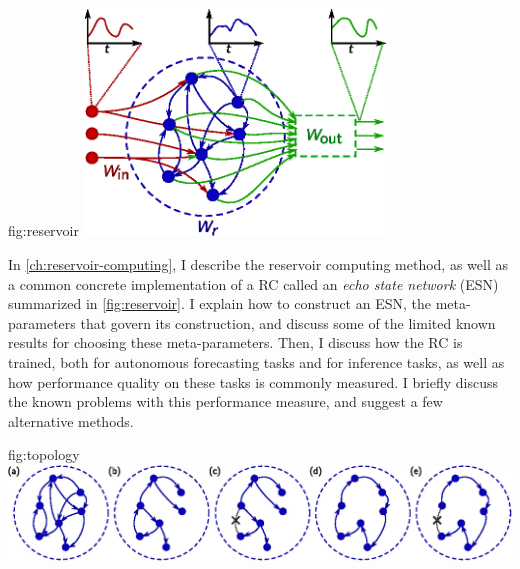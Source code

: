 \begin{reusefigure}{fig:reservoir}
  \includegraphics[width=0.6\textwidth]{figures/reservoir}
  \caption{High-level view of an echo state network RC. Each node may
    have two kinds of input connections: connections to other nodes in
    the network ($W_r$, blue), connections to the overall input
    ($W_\text{in}$, red). Each node may also have output connections
    to the overall output ($W_\text{out}$, green). Note that the
    internal connections may contain cycles.  When the RC is used to
    perform forecasting, the output on the right side is connected to
    the input on the left side, allowing the RC to run autonomously
    with no external input.}%
\end{reusefigure}

In \cref{ch:reservoir-computing}, I describe the reservoir computing
method, as well as a common concrete implementation of a RC called an
\emph{echo state network} (ESN) summarized in \cref{fig:reservoir}. I
explain how to construct an ESN, the meta-parameters that govern its
construction, and discuss some of the limited known results for
choosing these meta-parameters. Then, I discuss how the RC is trained,
both for autonomous forecasting tasks and for inference tasks, as well
as how performance quality on these tasks is commonly measured. I
briefly discuss the known problems with this performance measure, and
suggest a few alternative methods.

\begin{reusefigure}{fig:topology}
  \includegraphics[width=\textwidth]{figures/topology}
  \caption{The five reservoir structures tested. Only internal
    reservoir connections are pictured. Connections to the reservoir
    computer input, or to the output layer are not shown. (a) A
    general, fixed in-degree network, here pictured with $N=7$ and
    $k=2$. (b) A $k=1$ network with a single connected component. (c)
    A $k=1$ network with the single cycle cut at an arbitrary
    point. (d) A \emph{simple cycle reservoir}. (e) A \emph{delay line
      reservoir}.}%
\end{reusefigure}

